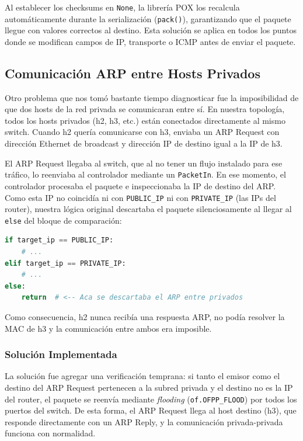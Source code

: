 \documentclass[11pt, a4paper]{article}
\begin{document}
Al establecer los checksums en \texttt{None}, la librería POX los recalcula automáticamente durante la serialización (\texttt{pack()}), garantizando que el paquete llegue con valores correctos al destino. Esta solución se aplica en todos los puntos donde se modifican campos de IP, transporte o ICMP antes de enviar el paquete.

\subsection{Comunicación ARP entre Hosts Privados}

Otro problema que nos tomó bastante tiempo diagnosticar fue la imposibilidad de que dos hosts de la red privada se comunicaran entre sí. En nuestra topología, todos los hosts privados (h2, h3, etc.) están conectados directamente al mismo switch. Cuando h2 quería comunicarse con h3, enviaba un ARP Request con dirección Ethernet de broadcast y dirección IP de destino igual a la IP de h3.

El ARP Request llegaba al switch, que al no tener un flujo instalado para ese tráfico, lo reenviaba al controlador mediante un \texttt{PacketIn}. En ese momento, el controlador procesaba el paquete e inspeccionaba la IP de destino del ARP. Como esta IP no coincidía ni con \texttt{PUBLIC\_IP} ni con \texttt{PRIVATE\_IP} (las IPs del router), nuestra lógica original descartaba el paquete silenciosamente al llegar al \texttt{else} del bloque de comparación:

\begin{lstlisting}[language=Python, caption=Lógica original que descartaba ARP entre privados.]
if target_ip == PUBLIC_IP:
    # ...
elif target_ip == PRIVATE_IP:
    # ...
else:
    return  # <-- Aca se descartaba el ARP entre privados
\end{lstlisting}

Como consecuencia, h2 nunca recibía una respuesta ARP, no podía resolver la MAC de h3 y la comunicación entre ambos era imposible.

\subsubsection{Solución Implementada}

La solución fue agregar una verificación temprana: si tanto el emisor como el destino del ARP Request pertenecen a la subred privada y el destino no es la IP del router, el paquete se reenvía mediante \textit{flooding} (\texttt{of.OFPP\_FLOOD}) por todos los puertos del switch. De esta forma, el ARP Request llega al host destino (h3), que responde directamente con un ARP Reply, y la comunicación privada-privada funciona con normalidad.
\end{document}
